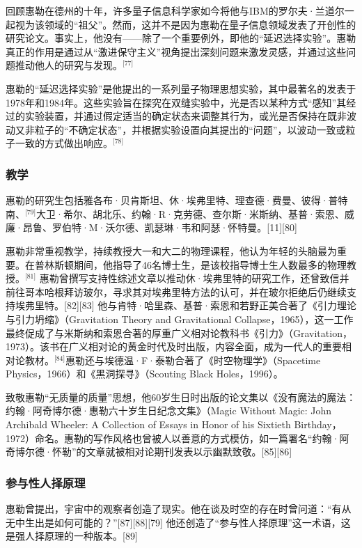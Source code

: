 回顾惠勒在德州的十年，许多量子信息科学家如今将他与IBM的罗尔夫·兰道尔一起视为该领域的“祖父”。然而，这并不是因为惠勒在量子信息领域发表了开创性的研究论文。事实上，他没有——除了一个重要例外，即他的“延迟选择实验”。惠勒真正的作用是通过从“激进保守主义”视角提出深刻问题来激发灵感，并通过这些问题推动他人的研究与发现。\(^\text{[77]}\)

惠勒的“延迟选择实验”是他提出的一系列量子物理思想实验，其中最著名的发表于1978年和1984年。这些实验旨在探究在双缝实验中，光是否以某种方式“感知”其经过的实验装置，并通过假定适当的确定状态来调整其行为，或光是否保持在既非波动又非粒子的“不确定状态”，并根据实验设置向其提出的“问题”，以波动一致或粒子一致的方式做出响应。\(^\text{[78]}\)
\subsubsection{教学}
惠勒的研究生包括雅各布·贝肯斯坦、休·埃弗里特、理查德·费曼、彼得·普特南、\(^\text{[79]}\)大卫·希尔、胡北乐、约翰·R·克劳德、查尔斯·米斯纳、基普·索恩、威廉·昂鲁、罗伯特·M·沃尔德、凯瑟琳·韦和阿瑟·怀特曼。[11][80]

惠勒非常重视教学，持续教授大一和大二的物理课程，他认为年轻的头脑最为重要。在普林斯顿期间，他指导了46名博士生，是该校指导博士生人数最多的物理教授。\(^\text{[81]}\) 惠勒曾撰写支持性综述文章以推动休·埃弗里特的研究工作，还曾致信并前往哥本哈根拜访玻尔，寻求其对埃弗里特方法的认可，并在玻尔拒绝后仍继续支持埃弗里特。[82][83] 他与肯特·哈里森、基普·索恩和若野正美合著了《引力理论与引力坍缩》（Gravitation Theory and Gravitational Collapse，1965），这一工作最终促成了与米斯纳和索恩合著的厚重广义相对论教科书《引力》（Gravitation，1973）。该书在广义相对论的黄金时代及时出版，内容全面，成为一代人的重要相对论教材。\(^\text{[84]}\)惠勒还与埃德温·F·泰勒合著了《时空物理学》（Spacetime Physics，1966）和《黑洞探寻》（Scouting Black Holes，1996）。

致敬惠勒“无质量的质量”思想，他60岁生日时出版的论文集以《没有魔法的魔法：约翰·阿奇博尔德·惠勒六十岁生日纪念文集》（Magic Without Magic: John Archibald Wheeler: A Collection of Essays in Honor of his Sixtieth Birthday，1972）命名。惠勒的写作风格也曾被人以善意的方式模仿，如一篇署名“约翰·阿奇博尔德·怀勒”的文章就被相对论期刊发表以示幽默致敬。[85][86]
\subsubsection{参与性人择原理}
惠勒曾提出，宇宙中的观察者创造了现实。他在谈及时空的存在时曾问道：“有从无中生出是如何可能的？”[87][88][79] 他还创造了“参与性人择原理”这一术语，这是强人择原理的一种版本。[89]

